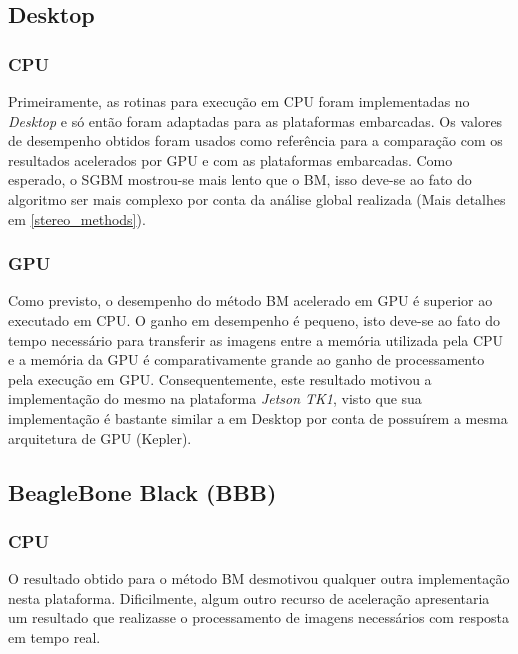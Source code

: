 \subsection{Desktop}
\subsubsection{CPU}

Primeiramente, as rotinas para execução em CPU foram implementadas no \textit{Desktop} e só então foram adaptadas para as plataformas embarcadas. Os valores de desempenho obtidos foram usados como referência para a comparação com os resultados acelerados por GPU e com as plataformas embarcadas. Como esperado, o SGBM mostrou-se mais lento que o BM, isso deve-se ao fato do algoritmo ser mais complexo por conta da análise global realizada (Mais detalhes em \ref{stereo_methods}). 

\subsubsection{GPU}

Como previsto, o desempenho do método BM acelerado em GPU é superior ao executado em CPU. O ganho em desempenho é pequeno, isto deve-se ao fato do tempo necessário para transferir as imagens entre a memória utilizada pela CPU e a memória da GPU é comparativamente grande ao ganho de processamento pela execução em GPU. Consequentemente, este resultado motivou a implementação do mesmo na plataforma \textit{Jetson TK1}, visto que sua implementação é bastante similar a em Desktop por conta de possuírem a mesma arquitetura de GPU (Kepler).  


\subsection{BeagleBone Black (BBB)}
\subsubsection{CPU}

O resultado obtido para o método BM desmotivou qualquer outra implementação nesta plataforma. Dificilmente, algum outro recurso de aceleração apresentaria um resultado que realizasse o processamento de imagens necessários com resposta em tempo real. 

